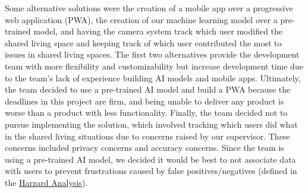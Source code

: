 \documentclass[12pt, titlepage]{article}
\begin{document}
\begin{enumerate}
  Some alternative solutions were the creation of a mobile app over a progressive web application (PWA), the creation of our machine learning model over a pre-trained model, and having the camera system track which user modified the shared living space and keeping track of which user contributed the most to issues in shared living spaces. The first two alternatives provide the development team with more flexibility and customizability but increase development time due to the team's lack of experience building AI models and mobile apps. Ultimately, the team decided to use a pre-trained AI model and build a PWA because the deadlines in this project are firm, and being unable to deliver any product is worse than a product with less functionality. Finally, the team decided not to pursue implementing the solution, which involved tracking which users did what in the shared living situations due to concerns raised by our supervisor. These concerns included privacy concerns and accuracy concerns. Since the team is using a pre-trained AI model, we decided it would be best to not associate data with users to prevent frustrations caused by false positives/negatives (defined in the \href{https://github.com/jinalkast/room8/tree/main/docs/HazardAnalysis}{Harzard Analysis}).
\end{enumerate}
\end{document}
